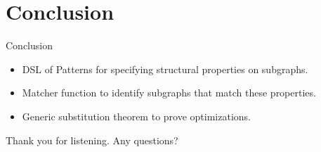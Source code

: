 \documentclass{beamer}
\begin{document}
\section{Conclusion}

\begin{frame}{Conclusion}
  \begin{itemize}
    \item DSL of Patterns for specifying structural properties on subgraphs.
    \item Matcher function to identify subgraphs that match these properties.
    \item Generic substitution theorem to prove optimizations.
  \end{itemize}
\end{frame}

\begin{frame}{Thank you for listening.}
  Any questions?
\end{frame}
\end{document}
